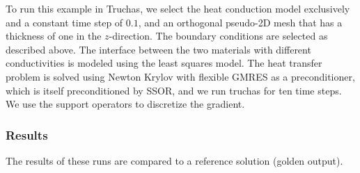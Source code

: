 \documentclass[12pt]{article}
\begin{document}
To run this example in Truchas, we select the heat conduction model
exclusively and a constant time step of $0.1$, and an orthogonal
pseudo-2D mesh that has a thickness of one in the $z$-direction. 
The boundary conditions are selected as described above.
The interface between the two materials with different conductivities
is modeled using the least squares model.
The heat transfer problem is solved using Newton Krylov with flexible
GMRES as a preconditioner, which is itself preconditioned by SSOR, and
we run truchas for ten time steps. We use the support  operators to
discretize the gradient. 


\subsubsection*{Results}

The results of these runs are compared to a reference solution (golden
output). 
\end{document}
